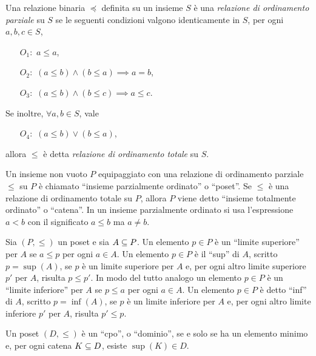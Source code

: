 \begin{definizione}  
Una relazione binaria $\preceq$ definita su un insieme
$S$ \`e una \emph{relazione di ordinamento parziale} su $S$
se le seguenti condizioni valgono identicamente in $S$,
per ogni $a, b, c \in S$,
\begin{itemize}
\item[$O_1:$] $a \leq a$,
\item[$O_2:$] $(a \leq b) \land (b \leq a) \implies a = b$,
\item[$O_3:$] $(a \leq b) \land (b \leq c) \implies a \leq c$.
\end{itemize}
Se inoltre, $\forall a, b \in S$, vale
\begin{itemize}
\item[$O_4:$] $(a \leq b) \lor (b \leq a)$,
\end{itemize}
allora $\leq$ \`e detta \emph{relazione di ordinamento totale} su $S$.
\end{definizione}

\begin{definizione}
Un insieme non vuoto $P$ equipaggiato con una relazione di ordinamento
parziale $\leq$ su $P$ \`e chiamato ``insieme parzialmente ordinato'' o
``poset''. Se $\leq$ \`e una relazione di ordinamento totale su $P$, allora
$P$ viene detto ``insieme totalmente ordinato'' o ``catena''.
In un insieme parzialmente ordinato si usa l'espressione $a<b$ con il
significato $a\leq b$ ma $a\not= b$.
\end{definizione}

\begin{definizione}
Sia $(P, \leq)$ un poset e sia $A \subseteq P$.
Un elemento $p\in P$ \`e un ``limite superiore'' per $A$ se $a \leq p$ per ogni
$a\in A$.
Un elemento $p\in P$ \`e il ``sup'' di $A$, scritto $p=\sup(A)$, se $p$ \`e un
limite superiore per $A$ e, per ogni altro limite superiore $p'$ per $A$,
risulta $p\leq p'$. In modo del tutto analogo
un elemento $p\in P$ \`e un ``limite inferiore'' per $A$ se $p \leq a$ per ogni
$a\in A$.
Un elemento $p\in P$ \`e detto ``inf'' di $A$, scritto $p=\inf(A)$, se $p$ \`e un
limite inferiore per $A$ e, per ogni altro limite inferiore $p'$ per $A$,
risulta $p'\leq p$.
\end{definizione}

\begin{definizione}
\label{def:cpo}
Un poset $(D, \leq)$ \`e un ``cpo'', o ``dominio'', se e solo se
ha un elemento minimo e, per ogni catena $K \subseteq D$, esiste $\sup(K)\in D$.
\end{definizione}

